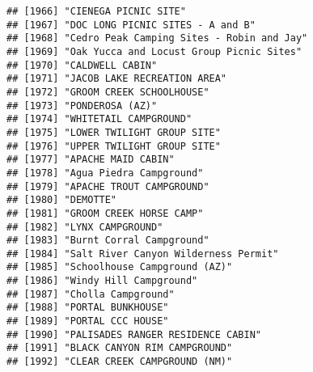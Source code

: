 \documentclass[
]{article}
\begin{document}
\begin{verbatim}
## [1966] "CIENEGA PICNIC SITE"                                                                 
## [1967] "DOC LONG PICNIC SITES - A and B"                                                     
## [1968] "Cedro Peak Camping Sites - Robin and Jay"                                            
## [1969] "Oak Yucca and Locust Group Picnic Sites"                                             
## [1970] "CALDWELL CABIN"                                                                      
## [1971] "JACOB LAKE RECREATION AREA"                                                          
## [1972] "GROOM CREEK SCHOOLHOUSE"                                                             
## [1973] "PONDEROSA (AZ)"                                                                      
## [1974] "WHITETAIL CAMPGROUND"                                                                
## [1975] "LOWER TWILIGHT GROUP SITE"                                                           
## [1976] "UPPER TWILIGHT GROUP SITE"                                                           
## [1977] "APACHE MAID CABIN"                                                                   
## [1978] "Agua Piedra Campground"                                                              
## [1979] "APACHE TROUT CAMPGROUND"                                                             
## [1980] "DEMOTTE"                                                                             
## [1981] "GROOM CREEK HORSE CAMP"                                                              
## [1982] "LYNX CAMPGROUND"                                                                     
## [1983] "Burnt Corral Campground"                                                             
## [1984] "Salt River Canyon Wilderness Permit"                                                 
## [1985] "Schoolhouse Campground (AZ)"                                                         
## [1986] "Windy Hill Campground"                                                               
## [1987] "Cholla Campground"                                                                   
## [1988] "PORTAL BUNKHOUSE"                                                                    
## [1989] "PORTAL CCC HOUSE"                                                                    
## [1990] "PALISADES RANGER RESIDENCE CABIN"                                                    
## [1991] "BLACK CANYON RIM CAMPGROUND"                                                         
## [1992] "CLEAR CREEK CAMPGROUND (NM)"                                                         

\end{verbatim}
\end{document}
